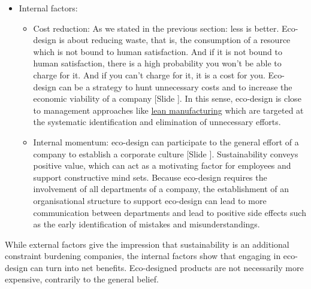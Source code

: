 \documentclass{article}
\newcounter{slide}
\begin{document}
\begin{itemize}
\begin{itemize}
	\end{itemize}
	\item Internal factors:
	\begin{itemize}
		\item Cost reduction: As we stated in the previous section: less is better. Eco-design is about reducing waste, that is, the consumption of a resource which is not bound to human satisfaction. And if it is not bound to human satisfaction, there is a high probability you won't be able to charge for it. And if you can't charge for it, it is a cost for you. Eco-design can be a strategy to hunt unnecessary costs and to increase the economic viability of a company {\color{blue}[Slide ]}. In this sense, eco-design is close to management approaches like \href{https://en.wikipedia.org/wiki/Lean_manufacturing}{lean manufacturing} which are targeted at the systematic identification and elimination of unnecessary efforts. 
		\item Internal momentum: eco-design can participate to the general effort of a company to establish a corporate culture {\color{blue}[Slide ]}. Sustainability conveys positive value, which can act as a motivating factor for employees and support constructive mind sets. Because eco-design requires the involvement of all departments of a company, the establishment of an organisational structure to support eco-design can lead to more communication between departments and lead to positive side effects such as the early identification of mistakes and misunderstandings. 
	\end{itemize}
\end{itemize}
While external factors give the impression that sustainability is an additional constraint burdening companies, the internal factors show that engaging in eco-design can turn into net benefits. Eco-designed products are not necessarily more expensive, contrarily to the general belief.
\end{document}
